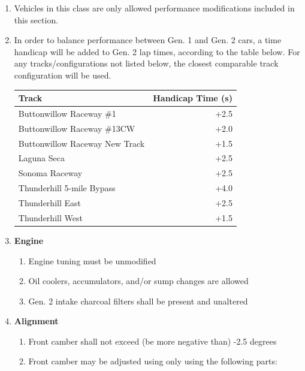 \documentclass{article}
\newenvironment{legallist}{
    \begin{enumerate}[label*=\arabic*.]
}{
    \end{enumerate}
}
\begin{document}
\begin{legallist}
			\begin{legallist}
				\item Vehicles in this class are only allowed performance modifications included in this section.
				\item In order to balance performance between Gen. 1 and Gen. 2 cars, a time handicap will be added to Gen. 2 lap times, according to the table below. For any tracks/configurations not listed below, the closest comparable track configuration will be used.
				\begin{longtable}{l r}
					\toprule
					\textbf{Track}                 & \textbf{Handicap Time (s)} \\
					\midrule
					Buttonwillow Raceway \#1       & +2.5                     \\
					\midrule
					Buttonwillow Raceway \#13CW    & +2.0                     \\
					\midrule
					Buttonwillow Raceway New Track & +1.5                     \\
					\midrule
					Laguna Seca                    & +2.5                     \\
					\midrule
					Sonoma Raceway                 & +2.5                     \\
					\midrule
					Thunderhill 5-mile Bypass      & +4.0                     \\
					\midrule
					Thunderhill East               & +2.5                     \\
					\midrule
					Thunderhill West               & +1.5                     \\
					\bottomrule
				\end{longtable}
								
				\item \textbf{Engine}
				\begin{legallist}
					\item Engine tuning must be unmodified
					\item Oil coolers, accumulators, and/or sump changes are allowed
					\item Gen. 2 intake charcoal filters shall be present and unaltered
				\end{legallist}
								
				\item \textbf{Alignment}
				\begin{legallist}
					\item Front camber shall not exceed (be more negative than) -2.5 degrees
					\item Front camber may be adjusted using only using the following parts:
										                        

\end{legallist}
\end{legallist}
\end{legallist}
\end{document}
